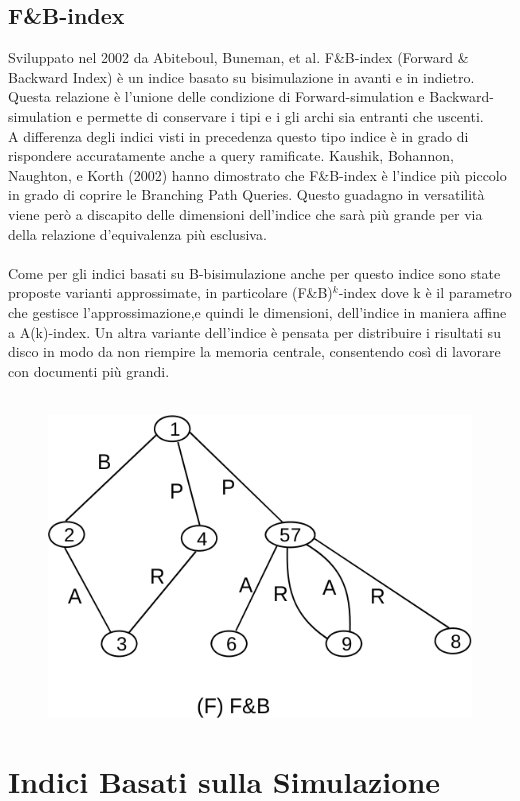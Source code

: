 \subsection{F\&B-index}
Sviluppato nel 2002 da Abiteboul, Buneman, et al. F\&B-index (Forward \& Backward Index) è un indice basato su bisimulazione in avanti e in indietro.\\
Questa relazione è l'unione delle condizione di Forward-simulation e Backward-simulation e permette di conservare i tipi e i gli archi sia entranti che uscenti.\\
A differenza degli indici visti in precedenza questo tipo indice è in grado di rispondere accuratamente anche a query ramificate. Kaushik, Bohannon, Naughton, e Korth (2002) hanno dimostrato che F\&B-index è l'indice più piccolo in grado di coprire le Branching Path Queries. Questo guadagno in versatilità viene però a discapito delle dimensioni dell'indice che sarà più grande per via della relazione d'equivalenza più esclusiva.
\\\\
Come per gli indici basati su B-bisimulazione anche per questo indice sono state proposte varianti approssimate, in particolare (F\&B)$^{k}$-index dove k è il parametro che gestisce l'approssimazione,e quindi le dimensioni, dell'indice in maniera affine a A(k)-index. Un altra variante dell'indice è pensata per distribuire i risultati su disco in modo da non riempire la memoria centrale, consentendo così di lavorare con documenti più grandi.\\\\
\begin{example}
\begin{figure}[H]
\centering
\includegraphics[scale=.4]{fb-index.png}
\end{figure}
\end{example}

\section{Indici Basati sulla Simulazione}